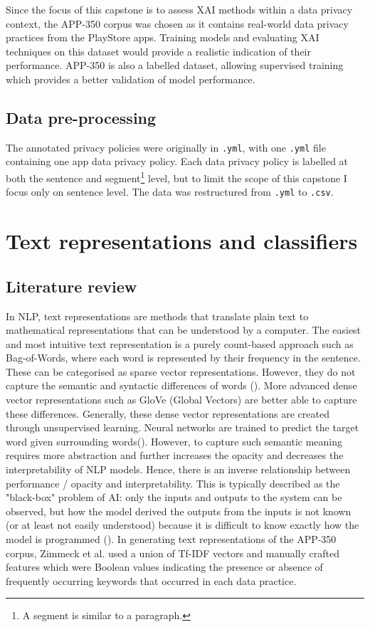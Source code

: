 Since the focus of this capstone is to assess XAI methods within a data privacy context, the APP-350 corpus was chosen as it contains real-world data privacy practices from the PlayStore apps. Training models and evaluating XAI techniques on this dataset would provide a realistic indication of their performance. APP-350 is also a labelled dataset, allowing supervised training which provides a better validation of model performance. 

\subsection{Data pre-processing}
The annotated privacy policies were originally in \texttt{.yml}, with one \texttt{.yml} file containing one app data privacy policy. Each data privacy policy is labelled at both the sentence and segment\footnote{A segment is similar to a paragraph.} level, but to limit the scope of this capstone I focus only on sentence level. The data was restructured from \texttt{.yml} to \texttt{.csv}.

\section{Text representations and classifiers}
\subsection{Literature review}
In NLP, text representations are methods that translate plain text to mathematical representations that can be understood by a computer. The easiest and most intuitive text representation is a purely count-based approach such as Bag-of-Words, where each word is represented by their frequency in the sentence. These can be categorised as sparse vector representations. However, they do not capture the semantic and syntactic differences of words (\cite{liu2020word}). More advanced dense vector representations such as GloVe (Global Vectors) are better able to capture these differences. Generally, these dense vector representations are created through unsupervised learning. Neural networks are trained to predict the target word given surrounding words(\cite{liu2020word}). However, to capture such semantic meaning requires more abstraction and further increases the opacity and decreases the interpretability of NLP models. Hence, there is an inverse relationship between performance / opacity and interpretability.  This is typically described as the "black-box" problem of AI: only the inputs and outputs to the system can be observed, but how the model derived the outputs from the inputs is not known (or at least not easily understood) because it is difficult to know exactly how the model is programmed (\cite{zednik2021}). In generating text representations of the APP-350 corpus, Zimmeck et al. used a union of Tf-IDF vectors and manually crafted features which were Boolean values indicating the presence or absence of frequently occurring keywords that occurred in each data practice.


